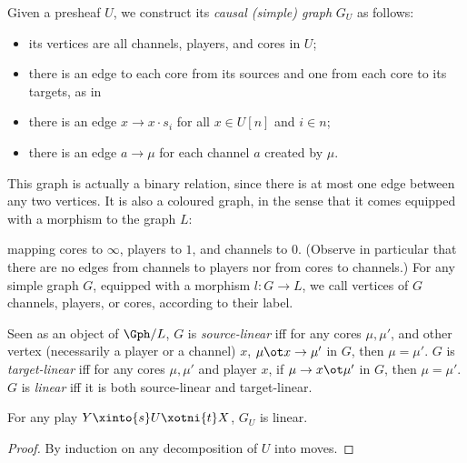\documentclass{LMCS}
\theoremstyle{plain}\newtheorem{satz}[thm]{Satz}
\begin{document}
 Given a presheaf $U$, we construct its \emph{causal
   (simple) graph} $G_U$ as follows:
 \begin{itemize}
 \item its vertices are all channels, players, and cores in $U$;
 \item there is an edge to each core from its sources and one from
   each core to its targets, as in
   \begin{center}
   \end{center}
 \item there is an edge $x \to x \cdot s_i$ for all $x \in U[n]$ and
   $i \in n$;
 \item there is an edge $a \to \mu$ for each channel $a$ created by $\mu$.
 \end{itemize}
 This graph is actually a binary relation, since there is at most one
 edge between any two vertices. It is also a coloured graph, in the
 sense that it comes equipped with a morphism to the graph $L$:
 \begin{center}
 \end{center}
 mapping cores to $\infty$, players to $1$, and channels to
 $0$. (Observe in particular that there are no edges from channels to
 players nor from cores to channels.)  For any simple graph $G$,
 equipped with a morphism $l \colon G \to L$, we call vertices of $G$
 channels, players, or cores, according to their label.


\begin{defi}
  Seen as an object of $\Gph / L$, $G$ is \emph{source-linear} iff
  for any cores $\mu, \mu'$, and other vertex (necessarily a player or a channel) $x$,
  $\mu \ot x \to \mu'$ in $G$, then $\mu = \mu'$.
  $G$ is \emph{target-linear} iff for any cores $\mu,\mu'$ and player $x$, if
  $\mu \to x \ot \mu'$ in $G$, then $\mu = \mu'$.
  $G$ is \emph{linear} iff it is both source-linear and target-linear.
\end{defi}

 \begin{prop}
   For any play $Y \xinto{s} U \xotni{t} X$, $G_U$ is linear.
 \end{prop}
 \begin{proof}
   By induction on any decomposition of $U$ into moves.
 \end{proof}
\end{document}
